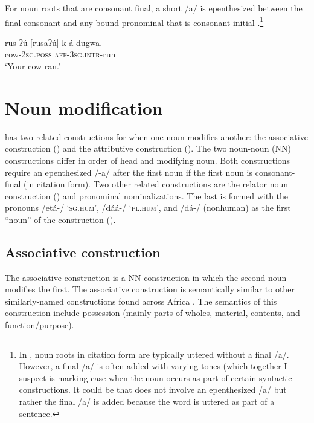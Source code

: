 \documentclass[output=paper]{langsci/langscibook}
\begin{document}
 
For noun roots that are consonant final, a short /a/ is epenthesized between the final consonant and any bound pronominal that is consonant initial .\footnote{In , noun roots in citation form are typically uttered without a final /a/.  However, a final /a/ is often added with varying tones (which together I suspect is marking case when the noun occurs as part of certain syntactic constructions. It could be that  does not involve an epenthesized /a/ but rather the final /a/ is added because the word is uttered as part of a sentence. }

\ea\label{ex:ahlandc:49}
\gll
{rus-ʔ\'{u} [rusaʔ\'{u}]}     k-á-dugwa. \\
cow-\textsc{2sg.poss}     \textsc{aff-3sg.intr}{}-run \\
\glt
‘Your cow ran.’
\z


\section{Noun modification}\label{sec:ahlandc:8}


 has two related constructions for when one noun modifies another: the associative construction () and the attributive construction (). The two noun-noun (NN) constructions differ in order of head and modifying noun. Both constructions require an epenthesized /-a/ after the first noun if the first noun is consonant-final (in citation form). Two other related constructions are the relator noun construction () and pronominal nominalizations. The last is formed with the pronouns /etá{}-/ ‘\textsc{sg.hum}', /dáá-/ ‘\textsc{pl.hum}', and /dá-/ (nonhuman) as the first “noun” of the construction ().


\subsection{Associative construction}\label{sec:ahlandc:8.1}

The associative construction is a NN construction in which the second noun modifies the first. The  associative construction is semantically similar to other similarly-named constructions found across Africa \citep[275-276]{Welmers1974}. The semantics of this construction include possession (mainly parts of wholes, material, contents, and function/purpose). 
\end{document}
